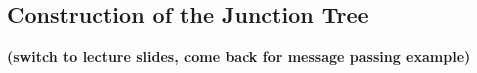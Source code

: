 \subsection{Construction of the Junction Tree}

\begin{frame} 
\textbf{(switch to lecture slides, come back for message passing example)}
\end{frame}


